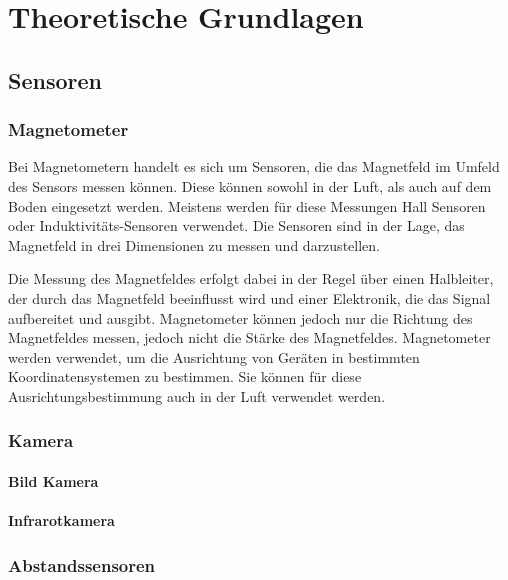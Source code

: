 \chapter{Theoretische Grundlagen}


\section{Sensoren} \label{sensoren:section}

    \subsection{Magnetometer} \label{magnetometer:subsection}

    Bei Magnetometern handelt es sich um Sensoren, die das Magnetfeld im Umfeld des Sensors messen können.
    Diese können sowohl in der Luft, als auch auf dem Boden eingesetzt werden.
    Meistens werden für diese Messungen Hall Sensoren oder Induktivitäts-Sensoren verwendet.
    Die Sensoren sind in der Lage, das Magnetfeld in drei Dimensionen zu messen und darzustellen.

    Die Messung des Magnetfeldes erfolgt dabei in der Regel über einen Halbleiter, der durch das Magnetfeld beeinflusst wird und einer Elektronik, die das Signal aufbereitet und ausgibt.
    Magnetometer können jedoch nur die Richtung des Magnetfeldes messen, jedoch nicht die Stärke des Magnetfeldes.
    Magnetometer werden verwendet, um die Ausrichtung von Geräten in bestimmten Koordinatensystemen zu bestimmen.
    Sie können für diese Ausrichtungsbestimmung auch in der Luft verwendet werden. 

    \subsection{Kamera} \label{kamera:section}

        \subsubsection{Bild Kamera} \label{bild_kamera:subsubsection}

        \subsubsection{Infrarotkamera} \label{infrarot_kamera:subsubsection}

    \subsection{Abstandssensoren} \label{abstandssensoren:subsection}

